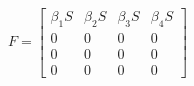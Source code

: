 \documentclass[preview]{standalone}
\begin{document}
\begin{align*}
F = \begin{bmatrix} \beta_1 S & \beta_2 S & \beta_3 S & \beta_4 S \\ 0 & 0 & 0 & 0 \\ 0 & 0 & 0 & 0 \\ 0 & 0 & 0 & 0 \end{bmatrix}
\end{align*}
\end{document}
